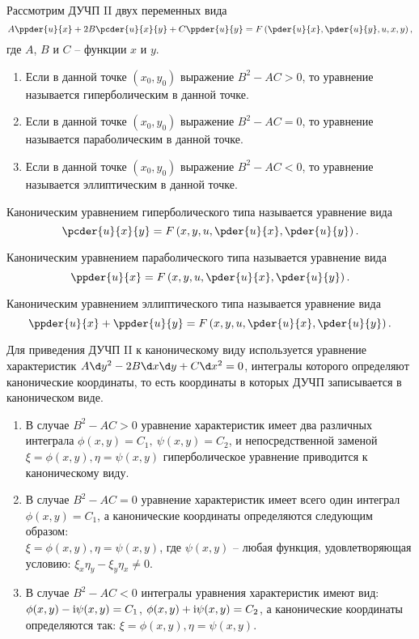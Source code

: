 
Рассмотрим ДУЧП II двух переменных вида
\[
    A\ppder{u}{x} + 2B\pcder{u}{x}{y} + C\ppder{u}{y} = F\left(\pder{u}{x},
    \pder{u}{y}, u, x, y\right),
\]
где \( A \), \( B \) и \( C \) -- функции \( x \) и \( y \).
\begin{enumerate}
    \item Если в данной точке \( (x_0, y_0) \) выражение \( B^2 - AC > 0 \),
    то уравнение называется гиперболическим в данной точке.
    \item Если в данной точке \( (x_0, y_0) \) выражение \( B^2 - AC = 0 \),
    то уравнение называется параболическим в данной точке.
    \item Если в данной точке \( (x_0, y_0) \) выражение \( B^2 - AC < 0 \),
    то уравнение называется эллиптическим в данной точке.
\end{enumerate}

Каноническим уравнением гиперболического типа называется уравнение вида
\[
    \pcder{u}{x}{y} = F\left(x, y, u, \pder{u}{x}, \pder{u}{y}\right).
\]

Каноническим уравнением параболического типа называется уравнение вида
\[
    \ppder{u}{x} = F\left(x, y, u, \pder{u}{x}, \pder{u}{y}\right).
\]

Каноническим уравнением эллиптического типа называется уравнение вида
\[
    \ppder{u}{x} + \ppder{u}{y} = F\left(x, y, u, \pder{u}{x}, \pder{u}{y}
    \right).
\]

\vspace*{.6em}
Для приведения ДУЧП II к каноническому виду используется уравнение
характеристик \( A\d y^2 - 2B\d x\d y + C\d x^2 = 0 \), интегралы которого
определяют канонические координаты, то есть координаты в которых ДУЧП
записывается в каноническом виде.
\begin{enumerate}
    \item В случае \( B^2 - AC > 0 \) уравнение характеристик имеет два
    различных интеграла \( \phi(x, y) = C_1,\ \psi(x, y) = C_2 \), и
    непосредственной заменой \( \xi =\phi(x, y), \eta = \psi(x, y) \)
    гиперболическое уравнение приводится к каноническому виду.

    \item В случае \( B^2 - AC = 0 \) уравнение характеристик имеет всего один
    интеграл\\
    \( \phi(x, y) = C_1 \), а канонические координаты определяются
    следующим образом:\\
    \( \xi =\phi(x, y), \eta = \psi(x, y) \), где
    \( \psi(x, y) \) -- любая функция, удовлетворяющая условию: \( \xi_x\eta_y -
    \xi_y\eta_x \ne 0 \).
    
    \item В случае \( B^2 - AC < 0 \) интегралы уравнения характеристик имеют
    вид:\\
    \( \phi(x, y)- \mathrm{i}\psi(x, y) = C_1 \), \( \phi(x, y) + \mathrm{i}\psi(x, y) =
    C_2 \), а канонические координаты определяются так: \( \xi =\phi(x, y),
    \eta = \psi(x, y) \).
\end{enumerate}

\newpage

